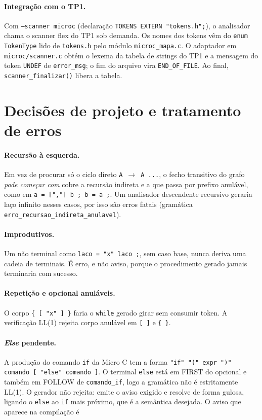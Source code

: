 \documentclass[11pt,a4paper]{article}
\begin{document}
\paragraph{Integração com o TP1.} Com \texttt{--scanner microc} (declaração
\texttt{TOKENS EXTERN "tokens.h";}), o analisador chama o scanner flex do TP1 sob demanda. Os
nomes dos tokens vêm do \texttt{enum TokenType} lido de \texttt{tokens.h} pelo módulo
\texttt{microc\_mapa.c}. O adaptador em \texttt{microc/scanner.c} obtém o lexema da tabela de
strings do TP1 e a mensagem do token \texttt{UNDEF} de \texttt{error\_msg}; o fim do arquivo
vira \texttt{END\_OF\_FILE}. Ao final, \texttt{scanner\_finalizar()} libera a tabela.

\section{Decisões de projeto e tratamento de erros}

\paragraph{Recursão à esquerda.} Em vez de procurar só o ciclo direto \texttt{A $\to$ A ...},
o fecho transitivo do grafo \emph{pode começar com} cobre a recursão indireta e a que passa por
prefixo anulável, como em \texttt{a = [","] b ; b = a ;}. Um analisador descendente recursivo
geraria laço infinito nesses casos, por isso são erros fatais (gramática
\texttt{erro\_recursao\_indireta\_anulavel}).

\paragraph{Improdutivos.} Um não terminal como \texttt{laco = "x" laco ;}, sem caso base, nunca
deriva uma cadeia de terminais. É erro, e não aviso, porque o procedimento gerado jamais
terminaria com sucesso.

\paragraph{Repetição e opcional anuláveis.} O corpo \texttt{\{ [ "x" ] \}} faria o \texttt{while}
gerado girar sem consumir token. A verificação LL(1) rejeita corpo anulável em \texttt{[ ]} e
\texttt{\{ \}}.

\paragraph{\emph{Else} pendente.} A produção do comando \texttt{if} da Micro C tem a forma
\texttt{"if" "(" expr ")" comando [ "else" comando ]}. O terminal \texttt{else} está em FIRST do
opcional e também em FOLLOW de \texttt{comando\_if}, logo a gramática não é estritamente LL(1).
O gerador não rejeita: emite o aviso exigido e resolve de forma gulosa, ligando o \texttt{else} ao
\texttt{if} mais próximo, que é a semântica desejada. O aviso que aparece na compilação é
\end{document}
